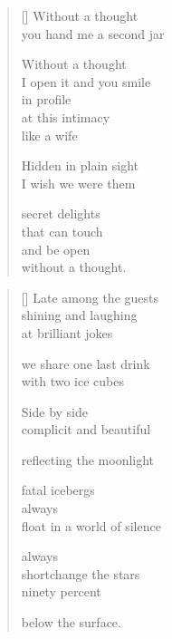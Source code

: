 \documentclass[14pt]{extbook}
\newcommand*{\centeredornament}{\centerline{\pgfornament[width=6cm]{88}}}
\begin{document}

\newpage

\vspace*{-15mm}
\centeredornament
\vspace*{-7mm}


\settowidth{\versewidth}{You hand me a second jar}

\begin{verse}[\versewidth]
  Without a thought \\
  you hand me a second jar

  Without a thought \\
  I open it and you smile \\
  in profile \\
  at this intimacy \\
  like a wife

  Hidden in plain sight \\
  I wish we were them

  secret delights \\
  that can touch \\
  and be open \\
  without a thought.
\end{verse}


\newpage

\vspace*{-15mm}
\centeredornament
\vspace*{-7mm}


\settowidth{\versewidth}{float on a world of silence}

\begin{verse}[\versewidth]
  Late among the guests \\
  shining and laughing \\
  at brilliant jokes

  we share one last drink \\
  with two ice cubes

  Side by side \\
  complicit and beautiful

  reflecting the moonlight

  fatal icebergs \\
  always \\
  float in a world of silence

  always \\
  shortchange the stars \\
  ninety percent

  below the surface.
\end{verse}
\end{document}
